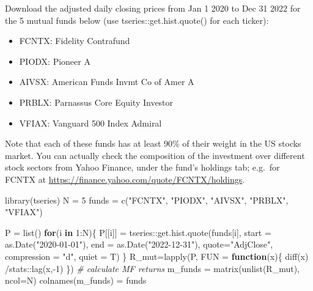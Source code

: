 \documentclass[
  oneside]{book}
\newenvironment{Shaded}{\begin{snugshade}}{\end{snugshade}}
\newcommand{\AttributeTok}[1]{\textcolor[rgb]{0.77,0.63,0.00}{#1}}
\newcommand{\CommentTok}[1]{\textcolor[rgb]{0.56,0.35,0.01}{\textit{#1}}}
\newcommand{\ControlFlowTok}[1]{\textcolor[rgb]{0.13,0.29,0.53}{\textbf{#1}}}
\newcommand{\DecValTok}[1]{\textcolor[rgb]{0.00,0.00,0.81}{#1}}
\newcommand{\FunctionTok}[1]{\textcolor[rgb]{0.00,0.00,0.00}{#1}}
\newcommand{\NormalTok}[1]{#1}
\newcommand{\OtherTok}[1]{\textcolor[rgb]{0.56,0.35,0.01}{#1}}
\newcommand{\SpecialCharTok}[1]{\textcolor[rgb]{0.00,0.00,0.00}{#1}}
\newcommand{\StringTok}[1]{\textcolor[rgb]{0.31,0.60,0.02}{#1}}
\providecommand{\tightlist}{%
  \setlength{\itemsep}{0pt}\setlength{\parskip}{0pt}}
\begin{document}
Download the adjusted daily closing prices from Jan 1 2020 to Dec 31 2022 for the
5 mutual funds below (use tseries::get.hist.quote() for each ticker):

\begin{itemize}
\tightlist
\item
  FCNTX: Fidelity Contrafund
\item
  PIODX: Pioneer A
\item
  AIVSX: American Funds Invmt Co of Amer A
\item
  PRBLX: Parnassus Core Equity Investor
\item
  VFIAX: Vanguard 500 Index Admiral
\end{itemize}

Note that each of these funds has at least 90\% of their weight in the US stocks market. You can actually check the composition of the investment over different stock sectors from Yahoo Finance, under the fund's holdings tab; e.g.~for FCNTX at \url{https://finance.yahoo.com/quote/FCNTX/holdings}.

\begin{Shaded}
\begin{Highlighting}[]
\FunctionTok{library}\NormalTok{(tseries)}
\NormalTok{N }\OtherTok{=} \DecValTok{5}
\NormalTok{funds }\OtherTok{=} \FunctionTok{c}\NormalTok{(}\StringTok{"FCNTX"}\NormalTok{, }\StringTok{"PIODX"}\NormalTok{, }\StringTok{"AIVSX"}\NormalTok{, }\StringTok{"PRBLX"}\NormalTok{, }\StringTok{"VFIAX"}\NormalTok{)}

\NormalTok{P }\OtherTok{=} \FunctionTok{list}\NormalTok{()}
\ControlFlowTok{for}\NormalTok{(i }\ControlFlowTok{in} \DecValTok{1}\SpecialCharTok{:}\NormalTok{N)\{}
\NormalTok{  P[[i]] }\OtherTok{=}\NormalTok{ tseries}\SpecialCharTok{::}\FunctionTok{get.hist.quote}\NormalTok{(funds[i],}
                        \AttributeTok{start =} \FunctionTok{as.Date}\NormalTok{(}\StringTok{"2020{-}01{-}01"}\NormalTok{),}
                        \AttributeTok{end =} \FunctionTok{as.Date}\NormalTok{(}\StringTok{"2022{-}12{-}31"}\NormalTok{),}
                        \AttributeTok{quote=}\StringTok{"AdjClose"}\NormalTok{,}
                        \AttributeTok{compression =} \StringTok{"d"}\NormalTok{,}
                        \AttributeTok{quiet =}\NormalTok{ T)}
\NormalTok{\}}
\NormalTok{R\_mut}\OtherTok{=}\FunctionTok{lapply}\NormalTok{(P, }\AttributeTok{FUN =} \ControlFlowTok{function}\NormalTok{(x)\{ }\FunctionTok{diff}\NormalTok{(x) }\SpecialCharTok{/}\NormalTok{stats}\SpecialCharTok{::}\FunctionTok{lag}\NormalTok{(x,}\SpecialCharTok{{-}}\DecValTok{1}\NormalTok{) \}) }\CommentTok{\# calculate MF returns}
\NormalTok{m\_funds }\OtherTok{=} \FunctionTok{matrix}\NormalTok{(}\FunctionTok{unlist}\NormalTok{(R\_mut), }\AttributeTok{ncol=}\NormalTok{N)}
\FunctionTok{colnames}\NormalTok{(m\_funds) }\OtherTok{=}\NormalTok{ funds}
\end{Highlighting}
\end{Shaded}
\end{document}
